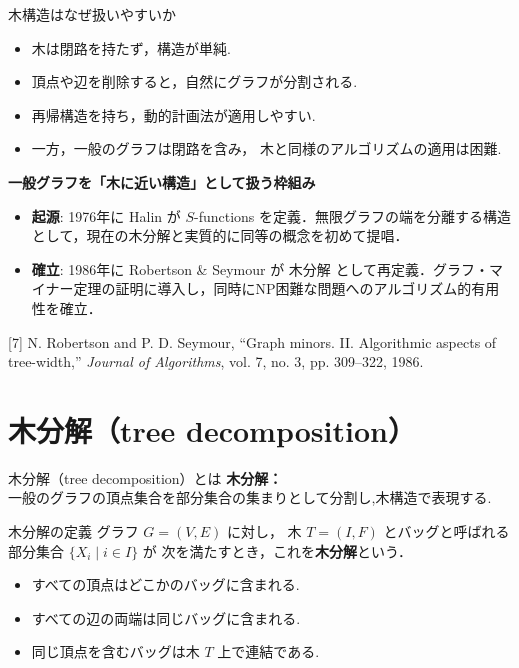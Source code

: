 \documentclass[aspectratio=169]{beamer}
\begin{document}
\begin{frame}{木構造はなぜ扱いやすいか}
\begin{itemize}
  \setlength{\parskip}{0.5em}

  \item 木は閉路を持たず，構造が単純.
  \item 頂点や辺を削除すると，自然にグラフが分割される.
  \item \Rightarrow 再帰構造を持ち，動的計画法が適用しやすい.

  \item 一方，一般のグラフは閉路を含み，
        木と同様のアルゴリズムの適用は困難.

\vspace{0.7em}
\end{itemize}
		\centering
	  \textbf{一般グラフを「木に近い構造」として扱う枠組み \quad \Rrightarrow \quad \color{blue}{木分解}}\cite{robertson1986graph}\\
    
  
\vspace{0.7em}
\small
\begin{itemize}
  \setlength{\parskip}{0.5em}
    \item \textbf{起源}: 1976年に \alert{Halin} が \alert{$S$-functions} を定義\cite{halin1976s}．無限グラフの端を分離する構造として，現在の木分解と実質的に同等の概念を初めて提唱．
    \item \textbf{確立}: 1986年に \alert{Robertson \& Seymour} が \alert{木分解} として再定義．グラフ・マイナー定理の証明に導入し，同時にNP困難な問題へのアルゴリズム的有用性を確立．
\end{itemize}
\vfill
\raggedright
{\scriptsize [7] N. Robertson and P. D. Seymour, ``Graph minors. II. Algorithmic aspects of tree-width,'' \textit{Journal of Algorithms}, vol. 7, no. 3, pp. 309--322, 1986.}
\end{frame}

\section{木分解（tree decomposition）}
\begin{frame}{木分解（tree decomposition）とは}
	\textbf{木分解：}
	\\一般のグラフの頂点集合を部分集合の集まりとして分割し,木構造で表現する.
\vspace{1em}
\begin{block}{木分解の定義}
グラフ $G=(V,E)$ に対し，
木 $T=(I,F)$ とバッグと呼ばれる部分集合 $\{X_i \mid i\in I\}$ が
次を満たすとき，これを\textbf{木分解}という\cite{robertson1986graph}．
\vspace{1em}
\begin{itemize}
  \setlength{\leftskip}{2em}
  \setlength{\parskip}{0.4em}
  \item[(TD1)] すべての頂点はどこかのバッグに含まれる.
  \item[(TD2)] すべての辺の両端は同じバッグに含まれる.
  \item[(TD3)] 同じ頂点を含むバッグは木 $T$ 上で連結である.
\end{itemize}
\vspace{1.5em}
\end{block}
\end{frame}
\end{document}
